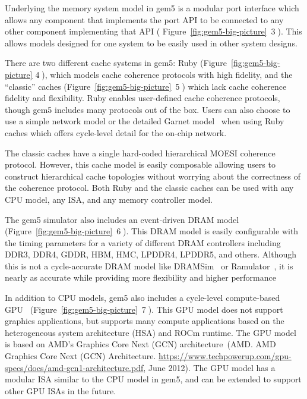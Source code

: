 Underlying the memory system model in gem5 is a modular port interface which allows any component that implements the port API to be connected to any other component implementing that API ( Figure~\ref{fig:gem5-big-picture}~\textcircled{3}).
This allows models designed for one system to be easily used in other system designs.

There are two different cache systems in gem5: Ruby (Figure~\ref{fig:gem5-big-picture} \textcircled{4}), which models cache coherence protocols with high fidelity, and the ``classic'' caches (Figure~\ref{fig:gem5-big-picture}~\textcircled{5}) which lack cache coherence fidelity and flexibility.
Ruby enables user-defined cache coherence protocols, though gem5 includes many protocols out of the box.
Users can also choose to use a simple network model or the detailed Garnet model~\cite{garnet-2} when using Ruby caches which offers cycle-level detail for the on-chip network.

The classic caches have a single hard-coded hierarchical MOESI coherence protocol.
However, this cache model is easily composable allowing users to construct hierarchical cache topologies without worrying about the correctness of the coherence protocol.
Both Ruby and the classic caches can be used with any CPU model, any ISA, and any memory controller model.

The gem5 simulator also includes an event-driven DRAM model (Figure~\ref{fig:gem5-big-picture}~\textcircled{6}).
This DRAM model is easily configurable with the timing parameters for a variety of different DRAM controllers including DDR3, DDR4, GDDR, HBM, HMC, LPDDR4, LPDDR5, and others.
Although this is not a cycle-accurate DRAM model like DRAMSim~\cite{wang_05, dramsim2, dramsim3} or Ramulator~\cite{yoongy_16}, it is nearly as accurate while providing more flexibility and higher performance~\cite{hansson-ispass-paper}

In addition to CPU models, gem5 also includes a cycle-level compute-based GPU~\cite{} (Figure~\ref{fig:gem5-big-picture}~\textcircled{7}).
This GPU model does not support graphics applications, but supports many compute applications based on the heterogeneous system architecture (HSA) and ROCm runtime.
The GPU model is based on AMD's Graphics Core Next (GCN) architecture~\cite{}(AMD. AMD Graphics Core Next (GCN) Architecture. \url{https://www.techpowerup.com/gpu-specs/docs/amd-gcn1-architecture.pdf}, June 2012).
The GPU model has a modular ISA similar to the CPU model in gem5, and can be extended to support other GPU ISAs in the future.

